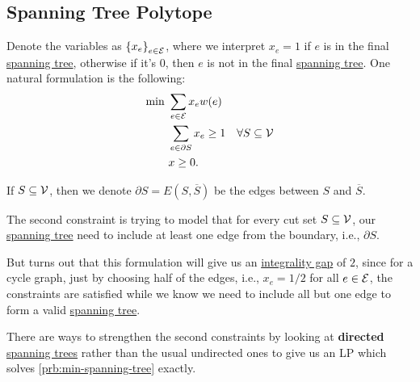 \subsection{Spanning Tree Polytope}
Denote the variables as \(\left\{ x_e \right\} _{e\in \mathcal{\MakeUppercase{e}} }\), where we interpret \(x_e = 1\) if \(e\) is in the final \hyperref[def:spanning-tree]{spanning tree}, otherwise if it's \(0\), then \(e\) is not in the final \hyperref[def:spanning-tree]{spanning tree}. One natural formulation is the following:
\[
	\begin{aligned}
		\min~ & \sum_{e\in \mathcal{\MakeUppercase{e}} } x_e w(e)                                  \\
		      & \sum_{e\in \partial S} x_e \geq 1                 & \forall S\subseteq \mathcal{V} \\
		      & x \geq 0.
	\end{aligned}
\]
\begin{notation}
	If \(S \subseteq \mathcal{\MakeUppercase{v}} \), then we denote \(\partial S = E(S, \overline{S} )\) be the edges between \(S\) and \(\overline{S} \).
\end{notation}
\begin{intuition}
	The second constraint is trying to model that for every cut set \(S \subseteq \mathcal{\MakeUppercase{v}} \), our \hyperref[def:spanning-tree]{spanning tree} need to include at least one edge from the boundary, i.e., \(\partial S\).
\end{intuition}

But turns out that this formulation will give us an \hyperref[def:integrality-gap]{integrality gap} of \(2\), since for a cycle graph, just by choosing half of the edges, i.e., \(x_e = 1 / 2\) for all \(e\in \mathcal{\MakeUppercase{e}} \), the constraints are satisfied while we know we need to include all but one edge to form a valid \hyperref[def:spanning-tree]{spanning tree}.

\begin{remark}
	There are ways to strengthen the second constraints by looking at \textbf{directed} \hyperref[def:spanning-tree]{spanning trees} rather than the usual undirected ones to give us an LP which solves \autoref{prb:min-spanning-tree} exactly.
\end{remark}

